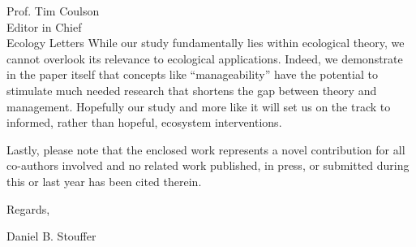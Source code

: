 \documentclass[10pt, a4paper]{letter}
\begin{document}
\begin{letter}{
       Prof. Tim Coulson\\
       Editor in Chief\\
       Ecology Letters}
While our study fundamentally lies within ecological theory, we cannot
overlook its relevance to ecological applications. Indeed, we demonstrate in
the paper itself that concepts like ``manageability'' have the potential to
stimulate much needed research that shortens the gap between theory and
management. Hopefully our study and more like it will set us on the track to
informed, rather than hopeful, ecosystem interventions.

Lastly, please note that the enclosed work represents a novel contribution for
all co-authors involved and no related work published, in press, or submitted
during this or last year has been cited therein.

\closing{Regards,}

Daniel B. Stouffer

\end{letter}
\end{document}
